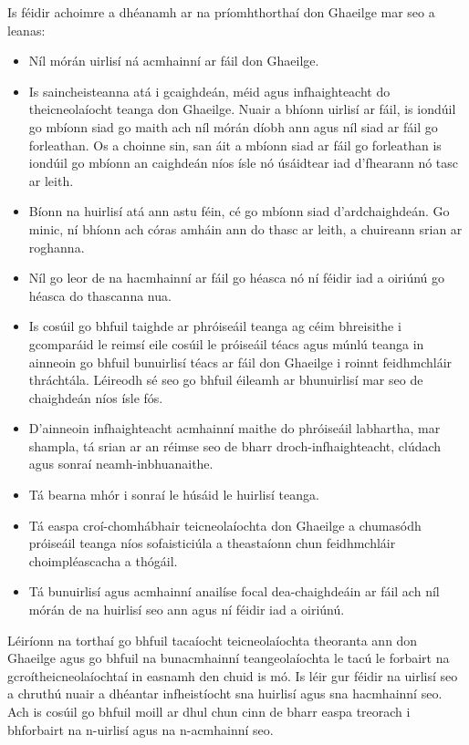 \documentclass[]{../../metanetpaper}
\begin{document}
\begin{multicols}{2}
Is féidir achoimre a dhéanamh ar na príomhthorthaí don Ghaeilge mar seo a leanas:

\begin{itemize}
\item Níl mórán uirlisí ná acmhainní ar fáil don Ghaeilge.
\item Is saincheisteanna atá i gcaighdeán, méid agus infhaighteacht do theicneolaíocht teanga don Ghaeilge. Nuair a bhíonn uirlisí ar fáil, is iondúil go mbíonn siad go maith ach níl mórán díobh ann agus níl siad ar fáil go forleathan. Os a choinne sin, san áit a mbíonn siad ar fáil go forleathan is iondúil go mbíonn an caighdeán níos ísle nó úsáidtear iad d’fhearann nó tasc ar leith.
\item Bíonn na huirlisí atá ann astu féin, cé go mbíonn siad d’ardchaighdeán. Go minic, ní bhíonn ach córas amháin ann do thasc ar leith, a chuireann srian ar roghanna.
\item Níl go leor de na hacmhainní ar fáil go héasca nó ní féidir iad a oiriúnú go héasca do thascanna nua.
\item Is cosúil go bhfuil taighde ar phróiseáil teanga ag céim bhreisithe i gcomparáid le reimsí eile cosúil le próiseáil téacs agus múnlú teanga in ainneoin go bhfuil bunuirlisí téacs ar fáil don Ghaeilge i roinnt feidhmchláir thráchtála. Léireodh sé seo go bhfuil éileamh ar bhunuirlisí mar seo de chaighdeán níos ísle fós.
\item D'ainneoin infhaighteacht acmhainní maithe do phróiseáil labhartha, mar shampla, tá srian ar an réimse seo de bharr droch-infhaighteacht, clúdach agus sonraí neamh-inbhuanaithe.
\item Tá bearna mhór i sonraí le húsáid le huirlisí teanga.	
\item Tá easpa croí-chomhábhair teicneolaíochta don Ghaeilge a chumasódh próiseáil teanga níos sofaisticiúla a theastaíonn chun feidhmchláir choimpléascacha a thógáil.
\item Tá bunuirlisí agus acmhainní anailíse focal dea-chaighdeáin ar fáil ach níl mórán de na huirlisí seo ann agus ní féidir iad a oiriúnú.
\end{itemize}

Léiríonn na torthaí go bhfuil tacaíocht teicneolaíochta theoranta ann don Ghaeilge agus go bhfuil na bunacmhainní teangeolaíochta le tacú le forbairt na gcroítheicneolaíochtaí in easnamh den chuid is mó. Is léir gur féidir na uirlisí seo a chruthú nuair a dhéantar infheistíocht sna huirlisí agus sna hacmhainní seo. Ach is cosúil go bhfuil moill ar dhul chun cinn de bharr easpa treorach i bhforbairt na n-uirlisí agus na n-acmhainní seo.


\end{multicols}
\end{document}
